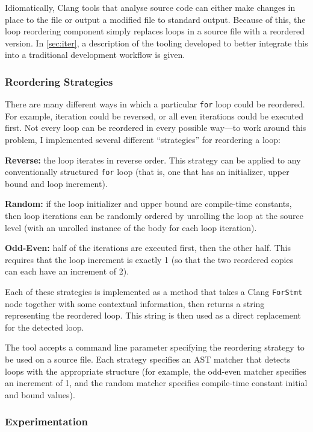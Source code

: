 \documentclass[journal]{IEEEtran}
\begin{document}
Idiomatically, Clang tools that analyse source code can either make changes in
place to the file or output a modified file to standard output. Because of this,
the loop reordering component simply replaces loops in a source file with a
reordered version. In \autoref{sec:iter}, a description of the tooling developed
to better integrate this into a traditional development workflow is given.

\subsubsection{Reordering Strategies}

There are many different ways in which a particular \texttt{for} loop could be
reordered. For example, iteration could be reversed, or all even iterations
could be executed first. Not every loop can be reordered in every possible
way---to work around this problem, I implemented several different
``strategies'' for reordering a loop:

\textbf{Reverse:} the loop iterates in reverse order. This strategy can be
applied to any conventionally structured \texttt{for} loop (that is, one that
has an initializer, upper bound and loop increment).

\textbf{Random:} if the loop initializer and upper bound are compile-time
constants, then loop iterations can be randomly ordered by unrolling the loop at
the source level (with an unrolled instance of the body for each loop
iteration).

\textbf{Odd-Even:} half of the iterations are executed first, then the other
half. This requires that the loop increment is exactly 1 (so that the two
reordered copies can each have an increment of 2).

Each of these strategies is implemented as a method that takes a Clang
\texttt{ForStmt} node together with some contextual information, then returns a
string representing the reordered loop. This string is then used as a direct
replacement for the detected loop.

The tool accepts a command line parameter specifying the reordering strategy to
be used on a source file. Each strategy specifies an AST matcher that detects
loops with the appropriate structure (for example, the odd-even matcher
specifies an increment of 1, and the random matcher specifies compile-time
constant initial and bound values).

\subsubsection{Experimentation}
\end{document}
